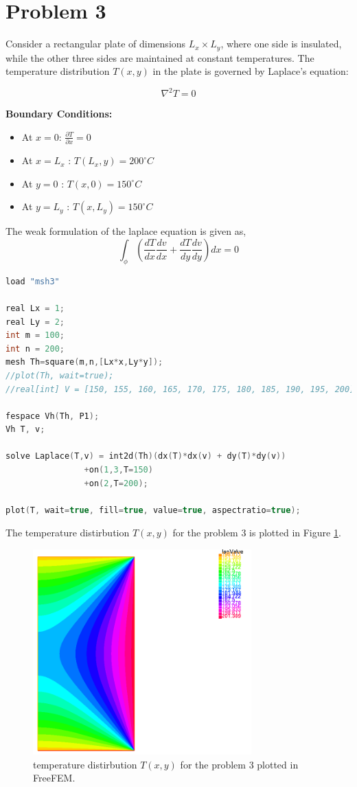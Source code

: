 \documentclass[11pt]{article} %
\begin{document}
\newpage
\section{Problem 3}
Consider a rectangular plate of dimensions $L_x \times L_y$, where one side is insulated, while the other three sides are maintained at constant temperatures. The temperature distribution $T(x, y)$ in the plate is governed by Laplace’s equation:

\begin{equation}
 \nabla^2 T = 0
\end{equation}

\textbf{Boundary Conditions:}
\begin{itemize}
\item At $x = 0$: $\frac{\partial{T}}{\partial{x}}= 0$
\item At $x = L_x$ : $T(L_x, y) = 200^\circ C$
\item At $y = 0$ : $T(x, 0) = 150^\circ C$
\item At $y = L_y$ : $T(x, L_y) = 150^\circ C$
\end{itemize}

The weak formulation of the laplace equation is given as,
\begin{equation}
\int_{\phi} \left( \frac{dT}{dx} \frac{dv}{dx} +   \frac{dT}{dy} \frac{dv}{dy} \right) dx = 0
\end{equation}

\begin{lstlisting}[language=C++, caption=Code to solve  Problem 3 in FreeFEM]
load "msh3"

real Lx = 1;
real Ly = 2;
int m = 100;
int n = 200;
mesh Th=square(m,n,[Lx*x,Ly*y]);
//plot(Th, wait=true);
//real[int] V = [150, 155, 160, 165, 170, 175, 180, 185, 190, 195, 200];

fespace Vh(Th, P1);
Vh T, v;

solve Laplace(T,v) = int2d(Th)(dx(T)*dx(v) + dy(T)*dy(v))
				+on(1,3,T=150)
				+on(2,T=200);

plot(T, wait=true, fill=true, value=true, aspectratio=true);
\end{lstlisting}

The temperature distirbution $T(x,y)$ for the problem 3 is plotted in Figure \ref{fig:q3}.

\begin{figure}[H]
\centering
\includegraphics[width=0.75\textwidth]{q3.png}
\caption{temperature distirbution $T(x,y)$ for the problem 3 plotted in FreeFEM.}
\label{fig:q3}
\end{figure}
\end{document}
